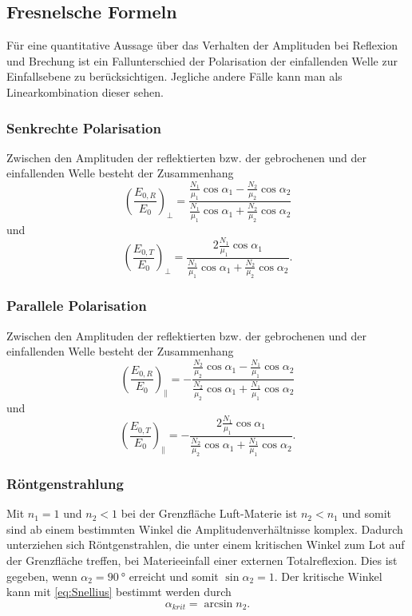 \subsection{Fresnelsche Formeln}
Für eine quantitative Aussage über das Verhalten der Amplituden bei Reflexion und Brechung ist ein Fallunterschied der Polarisation der einfallenden Welle zur Einfallsebene zu berücksichtigen.
Jegliche andere Fälle kann man als Linearkombination dieser sehen.\cite{physik}
\subsubsection*{Senkrechte Polarisation}
Zwischen den Amplituden der reflektierten bzw. der gebrochenen und der einfallenden Welle besteht der Zusammenhang
\begin{equation}
    \left(\frac{E_{0,R}}{E_0}\right)_\perp = \frac{\frac{N_1}{\mu_1}\cos\alpha_1 - \frac{N_2}{\mu_2}\cos\alpha_2}{\frac{N_1}{\mu_1}\cos\alpha_1 + \frac{N_2}{\mu_2}\cos\alpha_2}
\end{equation}
und
\begin{equation}
    \left(\frac{E_{0,T}}{E_0}\right)_\perp = \frac{2\frac{N_1}{\mu_1}\cos\alpha_1}{\frac{N_1}{\mu_1}\cos\alpha_1 + \frac{N_2}{\mu_2}\cos\alpha_2}\text{.}
\end{equation}
\subsubsection*{Parallele Polarisation}
Zwischen den Amplituden der reflektierten bzw. der gebrochenen und der einfallenden Welle besteht der Zusammenhang
\begin{equation}
    \left(\frac{E_{0,R}}{E_0}\right)_\parallel = -\frac{\frac{N_2}{\mu_2}\cos\alpha_1 - \frac{N_1}{\mu_1}\cos\alpha_2}{\frac{N_2}{\mu_2}\cos\alpha_1 + \frac{N_1}{\mu_1}\cos\alpha_2}
\end{equation}
und
\begin{equation}
    \left(\frac{E_{0,T}}{E_0}\right)_\parallel = -\frac{2\frac{N_1}{\mu_1}\cos\alpha_1}{\frac{N_2}{\mu_2}\cos\alpha_1 + \frac{N_1}{\mu_1}\cos\alpha_2}\text{.}
\end{equation}
\subsubsection*{Röntgenstrahlung}
Mit $n_1 = 1$ und $n_2 < 1$ bei der Grenzfläche Luft-Materie ist $n_2 < n_1$ und somit sind ab einem bestimmten Winkel die Amplitudenverhältnisse komplex.\cite{nolting}
Dadurch unterziehen sich Röntgenstrahlen, die unter einem kritischen Winkel zum Lot auf der Grenzfläche treffen, bei Materieeinfall einer externen Totalreflexion.\cite{reflexion}
Dies ist gegeben, wenn $\alpha_2 = \qty{90}{\degree}$ erreicht und somit $\sin\alpha_2 = 1$. Der kritische Winkel kann mit \autoref{eq:Snellius} bestimmt werden durch
\begin{equation}
    \alpha_{krit} = \arcsin n_2 \text{.} \label{eq:krit}
\end{equation}

